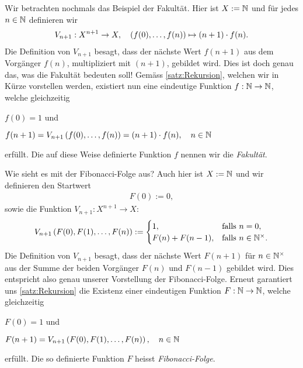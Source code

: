 {
Wir betrachten nochmals das Beispiel der Fakultät. Hier ist $X:=\mathbb{N}$ und für jedes $n\in\mathbb{N}$ definieren wir
\begin{align*}
    V_{n+1}: X^{n+1}\to X, \quad \left(f(0),\ldots,f(n)\right) \mapsto (n+1)\cdot f(n).
\end{align*}
Die Definition von $V_{n+1}$ besagt, dass der nächste Wert $f(n+1)$ aus dem Vorgänger $f(n)$, multipliziert mit $(n+1)$, gebildet wird. Dies ist doch genau das, was die Fakultät bedeuten soll! Gemäss \cref{satz:Rekursion}, welchen wir in Kürze vorstellen werden, existiert nun eine eindeutige Funktion $f:\mathbb{N}\to\mathbb{N}$, welche gleichzeitig
\begin{renum}
    \item $f(0) = 1$ und
    \item $f(n+1) = V_{n+1}\left(f(0),\ldots,f(n)\right) = (n+1)\cdot f(n), \quad n\in\mathbb{N}$
\end{renum}
erfüllt. Die auf diese Weise definierte Funktion $f$ nennen wir die \textit{Fakultät}.
}
{
Wie sieht es mit der Fibonacci-Folge aus? Auch hier ist $X:=\mathbb{N}$ und wir definieren den Startwert
\begin{align*}
    F(0) := 0,
\end{align*}
sowie die Funktion $V_{n+1}: X^{n+1}\to X$:
\[
  V_{n+1}\left(F(0),F(1),\ldots,F(n)\right) := 
  \begin{cases}
    1, &\text{falls $n = 0$}, \\
    F(n) + F(n-1), &\text{falls $n\in\mathbb{N}^{\times}$}.
  \end{cases}
\]
Die Definition von $V_{n+1}$ besagt, dass der nächste Wert $F(n+1)$ für $n\in\mathbb{N}^{\times}$ aus der Summe der beiden Vorgänger $F(n)$ und $F(n-1)$ gebildet wird. Dies entspricht also genau unserer Vorstellung der Fibonacci-Folge. Erneut garantiert uns \cref{satz:Rekursion} die Existenz einer eindeutigen Funktion $F:\mathbb{N}\to\mathbb{N}$, welche gleichzeitig
\begin{renum}
    \item $F(0) = 1$ und
    \item $F(n+1) = V_{n+1}\left(F(0),F(1),\ldots,F(n)\right), \quad n\in\mathbb{N}$
\end{renum}
erfüllt. Die so definierte Funktion $F$ heisst \textit{Fibonacci-Folge}.
}
